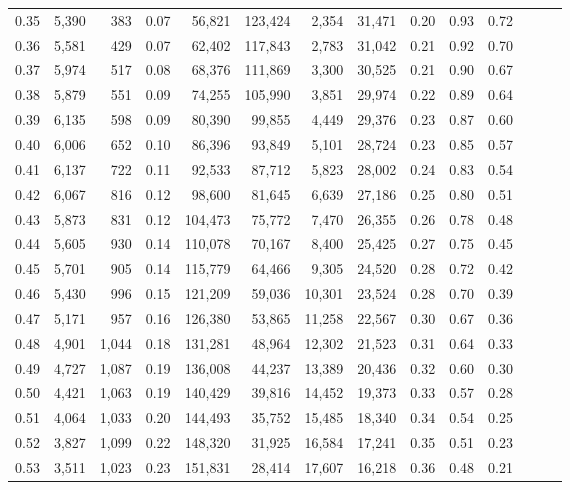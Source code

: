 \begin{tabular}{rrrrrrrrrrrrrr}
0.35 &  5,390 &    383 &  0.07 &   56,821 &  123,424 &   2,354 &  31,471 &  0.20 &  0.93 &      0.72 \\
0.36 &  5,581 &    429 &  0.07 &   62,402 &  117,843 &   2,783 &  31,042 &  0.21 &  0.92 &      0.70 \\
0.37 &  5,974 &    517 &  0.08 &   68,376 &  111,869 &   3,300 &  30,525 &  0.21 &  0.90 &      0.67 \\
0.38 &  5,879 &    551 &  0.09 &   74,255 &  105,990 &   3,851 &  29,974 &  0.22 &  0.89 &      0.64 \\
0.39 &  6,135 &    598 &  0.09 &   80,390 &   99,855 &   4,449 &  29,376 &  0.23 &  0.87 &      0.60 \\
0.40 &  6,006 &    652 &  0.10 &   86,396 &   93,849 &   5,101 &  28,724 &  0.23 &  0.85 &      0.57 \\
0.41 &  6,137 &    722 &  0.11 &   92,533 &   87,712 &   5,823 &  28,002 &  0.24 &  0.83 &      0.54 \\
0.42 &  6,067 &    816 &  0.12 &   98,600 &   81,645 &   6,639 &  27,186 &  0.25 &  0.80 &      0.51 \\
0.43 &  5,873 &    831 &  0.12 &  104,473 &   75,772 &   7,470 &  26,355 &  0.26 &  0.78 &      0.48 \\
0.44 &  5,605 &    930 &  0.14 &  110,078 &   70,167 &   8,400 &  25,425 &  0.27 &  0.75 &      0.45 \\
0.45 &  5,701 &    905 &  0.14 &  115,779 &   64,466 &   9,305 &  24,520 &  0.28 &  0.72 &      0.42 \\
0.46 &  5,430 &    996 &  0.15 &  121,209 &   59,036 &  10,301 &  23,524 &  0.28 &  0.70 &      0.39 \\
0.47 &  5,171 &    957 &  0.16 &  126,380 &   53,865 &  11,258 &  22,567 &  0.30 &  0.67 &      0.36 \\
0.48 &  4,901 &  1,044 &  0.18 &  131,281 &   48,964 &  12,302 &  21,523 &  0.31 &  0.64 &      0.33 \\
0.49 &  4,727 &  1,087 &  0.19 &  136,008 &   44,237 &  13,389 &  20,436 &  0.32 &  0.60 &      0.30 \\
0.50 &  4,421 &  1,063 &  0.19 &  140,429 &   39,816 &  14,452 &  19,373 &  0.33 &  0.57 &      0.28 \\
0.51 &  4,064 &  1,033 &  0.20 &  144,493 &   35,752 &  15,485 &  18,340 &  0.34 &  0.54 &      0.25 \\
0.52 &  3,827 &  1,099 &  0.22 &  148,320 &   31,925 &  16,584 &  17,241 &  0.35 &  0.51 &      0.23 \\
0.53 &  3,511 &  1,023 &  0.23 &  151,831 &   28,414 &  17,607 &  16,218 &  0.36 &  0.48 &      0.21 \\

\end{tabular}

